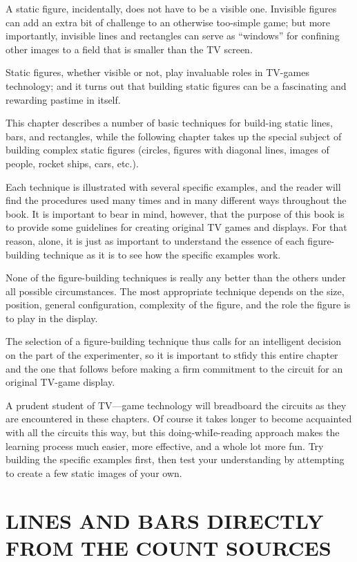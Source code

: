 \documentclass[11pt]{book}              %
\begin{document}
A static figure, incidentally, does not have to be a visible one. Invisible figures can add an extra bit of challenge to an otherwise too-simple game; but more importantly, invisible lines and rectangles can serve as “windows” for confining other images to a field that is smaller than the TV screen.

Static figures, whether visible or not, play invaluable roles in TV-games technology; and it turns out that building static figures can be a fascinating and rewarding pastime in itself.

This chapter describes a number of basic techniques for build-ing static lines, bars, and rectangles, while the following chapter takes up the special subject of building complex static figures (circles, figures with diagonal lines, images of people, rocket ships, cars, etc.).

Each technique is illustrated with several specific examples, and the reader will find the procedures used many times and in many different ways throughout the book. It is important to bear in mind, however, that the purpose of this book is to provide some guidelines for creating original TV games and displays. For that reason, alone, it is just as important to understand the essence of each figure-building technique as it is to see how the specific examples work.

None of the figure-building techniques is really any better than the others under all possible circumstances. The most appropriate technique depends on the size, position, general configuration, complexity of the figure, and the role the figure is to play in the display.

The selection of a figure-building technique thus calls for an intelligent decision on the part of the experimenter, so it is important to stfidy this entire chapter and the one that follows before making a firm commitment to the circuit for an original TV-game display.

A prudent student of TV—game technology will breadboard the circuits as they are encountered in these chapters. Of course it takes longer to become acquainted with all the circuits this way, but this doing-whiIe-reading approach makes the learning process much easier, more effective, and a whole lot more fun. Try building the specific examples first, then test your understanding by attempting to create a few static images of your own.

\section{LINES AND BARS DIRECTLY FROM THE COUNT SOURCES}
\end{document}
